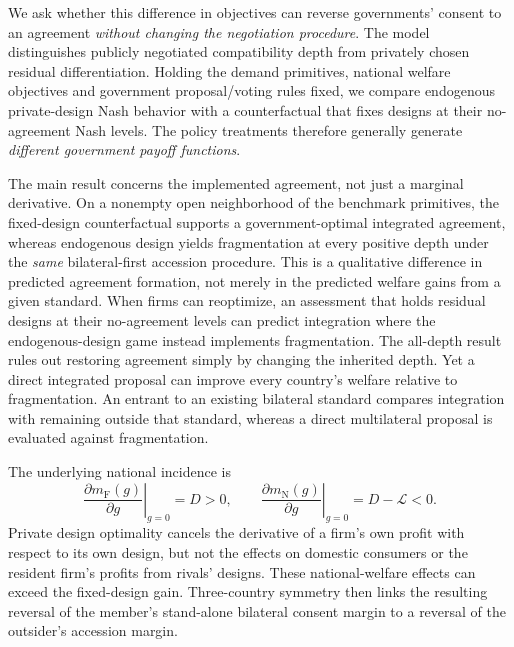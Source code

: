 \documentclass[11pt,a4paper]{article}
\theoremstyle{remark}\newtheorem{remark}[theorem]{Remark}
\newcommand{\N}{\mathrm{N}}\newcommand{\F}{\mathrm{F}}
\newcommand{\loss}{\mathcal L}\newcommand{\vect}[1]{\boldsymbol{#1}}
\begin{document}
We ask whether this difference in objectives can reverse governments' consent to an agreement \emph{without changing the negotiation procedure}. The model distinguishes publicly negotiated compatibility depth from privately chosen residual differentiation. Holding the demand primitives, national welfare objectives and government proposal/voting rules fixed, we compare endogenous private-design Nash behavior with a counterfactual that fixes designs at their no-agreement Nash levels. The policy treatments therefore generally generate \emph{different government payoff functions}.

The main result concerns the implemented agreement, not just a marginal derivative. On a nonempty open neighborhood of the benchmark primitives, the fixed-design counterfactual supports a government-optimal integrated agreement, whereas endogenous design yields fragmentation at every positive depth under the \emph{same} bilateral-first accession procedure. This is a qualitative difference in predicted agreement formation, not merely in the predicted welfare gains from a given standard. When firms can reoptimize, an assessment that holds residual designs at their no-agreement levels can predict integration where the endogenous-design game instead implements fragmentation. The all-depth result rules out restoring agreement simply by changing the inherited depth. Yet a direct integrated proposal can improve every country's welfare relative to fragmentation. An entrant to an existing bilateral standard compares integration with remaining outside that standard, whereas a direct multilateral proposal is evaluated against fragmentation.

The underlying national incidence is
\begin{equation}\label{eq:introheadline}
\left.\frac{\partial m_{\F}(g)}{\partial g}\right|_{g=0}=D>0,\qquad
\left.\frac{\partial m_{\N}(g)}{\partial g}\right|_{g=0}=D-\loss<0.
\end{equation}
Private design optimality cancels the derivative of a firm's own profit with respect to its own design, but not the effects on domestic consumers or the resident firm's profits from rivals' designs. These national-welfare effects can exceed the fixed-design gain. Three-country symmetry then links the resulting reversal of the member's stand-alone bilateral consent margin to a reversal of the outsider's accession margin.
\end{document}
